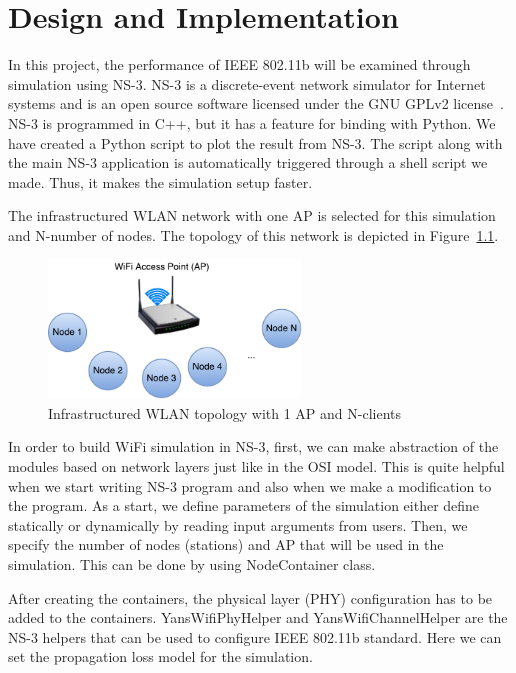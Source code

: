 \chapter{Design and Implementation}

In this project, the performance of IEEE 802.11b will be examined through simulation using NS-3. NS-3 is a discrete-event network simulator for Internet systems and is an open source software licensed under the GNU GPLv2 license~\cite{ns32015}. NS-3 is programmed in C++, but it has a feature for binding with Python. We have created a Python script to plot the result from NS-3. The script along with the main NS-3 application is automatically triggered through a shell script we made. Thus, it makes the simulation setup faster.

The infrastructured WLAN network with one AP is selected for this simulation and N-number of nodes. The topology of this network is depicted in Figure~\ref{fig:network-topology}.

\begin{figure}[H]
    \centering
    \includegraphics[width=0.6\textwidth]{figures/network-topology}
    \caption{Infrastructured WLAN topology with 1 AP and N-clients}
    \label{fig:network-topology}
\end{figure}

In order to build WiFi simulation in NS-3, first, we can make abstraction of the modules based on network layers just like in the OSI model. This is quite helpful when we start writing NS-3 program and also when we make a modification to the program. As a start, we define parameters of the simulation either define statically or dynamically by reading input arguments from users. Then, we specify the number of nodes (stations) and AP that will be used in the simulation. This can be done by using NodeContainer class.

After creating the containers, the physical layer (PHY) configuration has to be added to the containers. YansWifiPhyHelper and YansWifiChannelHelper are the NS-3 helpers that can be used to configure IEEE 802.11b standard. Here we can set the propagation loss model for the simulation.

